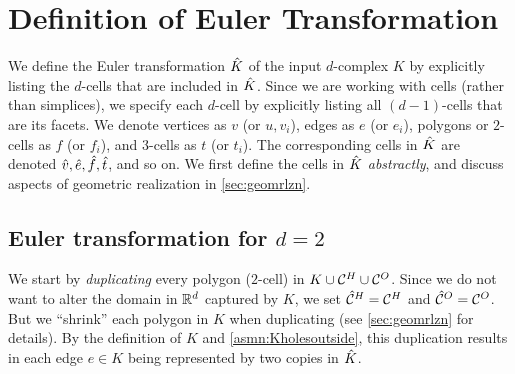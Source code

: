 \section{Definition of Euler Transformation} \label{sec:eulertsfm}

We define the Euler transformation $\hat{K}$ of the input $d$-complex $K$ by explicitly listing the $d$-cells that are included in $\hat{K}$.
Since we are working with cells (rather than simplices), we specify each $d$-cell by explicitly listing all $(d-1)$-cells that are its facets.
We denote vertices as $v$ (or $u, v_i$), edges as $e$ (or $e_i$), polygons or $2$-cells as $f$ (or $f_i$), and $3$-cells as $t$ (or $t_i$).
The corresponding cells in $\hat{K}$ are denoted $\hat{v}, \hat{e}, \hat{f}, \hat{t}$, and so on.
We first define the cells in $\hat{K}$ \emph{abstractly}, and discuss aspects of geometric realization in \cref{sec:geomrlzn}.

\vspace*{-0.05in}
\subsection{Euler transformation for $d=2$} \label{ssec:euler2d}
\vspace*{-0.05in}

We start by \emph{duplicating} every polygon ($2$-cell) in $K \cup \mathcal{C}^H \cup \mathcal{C}^O$.
Since we do not want to alter the domain in ${\mathbb R}^d$ captured by $K$, we set $\hat{\mathcal{C}}^H = \mathcal{C}^H$ and $\hat{\mathcal{C}}^O = \mathcal{C}^O$.
But we ``shrink'' each polygon in $K$ when duplicating (see \cref{sec:geomrlzn} for details).
By the definition of $K$ and \cref{asmn:Kholesoutside}, this duplication results in each edge $e \in K$ being represented by two copies in $\hat{K}$.

